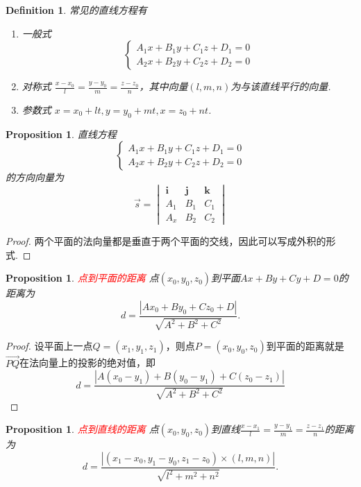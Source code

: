 \documentclass{article}
\newcommand{\mbf}[1]{\bm{#1}}
\newtheorem{proposition}[theorem]{Proposition}
\newtheorem{definition}[theorem]{Definition}
\newcommand{\redt}[1]{\textcolor{red}{#1}}
\begin{document}
\begin{definition}
\rm 常见的直线方程有
\begin{enumerate}
	\item 一般式
		$$
			\left\{
			\begin{array}{ll}
			A_1x+B_1y+C_1z+D_1 = 0 \\
			A_2x+B_2y+C_2z+D_2 = 0
			\end{array} \right.
		$$
	\item 对称式 $\frac{x-x_0}{l} = \frac{y-y_0}{m} = \frac{z-z_0}{n}$，其中向量$(l,m,n)$为与该直线平行的向量.
	\item 参数式 $x = x_0 + lt,y = y_0 + mt,x = z_0 + nt$. 	
\end{enumerate}
\end{definition}

\begin{proposition}
\rm 直线方程
$$
\left\{
			\begin{array}{ll}
			A_1x+B_1y+C_1z+D_1 = 0 \\
			A_2x+B_2y+C_2z+D_2 = 0
			\end{array} \right.
$$
的方向向量为
$$
\vec{s} = \begin{vmatrix}
\mbf{i} & \mbf{j} & \mbf{k} \\
A_1 & B_1 & C_1 \\
A_x & B_2 & C_2 
\end{vmatrix}
$$
\end{proposition}

\begin{proof}
两个平面的法向量都是垂直于两个平面的交线，因此可以写成外积的形式. 
\end{proof}

\begin{proposition}
\rm \redt{点到平面的距离} 点$(x_0,y_0,z_0)$到平面$Ax + By + Cy + D =0$的距离为
$$
d = \frac{|Ax_0 + By_0 + Cz_0 + D|}{\sqrt{A^2 + B^2 + C^2}}.
$$
\end{proposition}

\begin{proof}
设平面上一点$Q=(x_1,y_1,z_1)$，则点$P=(x_0,y_0,z_0)$到平面的距离就是$\vec{PQ}$在法向量上的投影的绝对值，即
$$
d = \frac{|A(x_0-y_1) + B(y_0-y_1) + C(z_0-z_1)|}{\sqrt{A^2 + B^2 + C^2}}
$$
\end{proof}

\begin{proposition}
\rm \redt{点到直线的距离} 点$(x_0,y_0,z_0)$到直线$\frac{x-x_1}{l} = \frac{y-y_1}{m} = \frac{z-z_1}{n}$的距离为
$$
d = \frac{|(x_1-x_0,y_1-y_0,z_1-z_0) \times (l,m,n)|}{\sqrt{l^2+m^2+n^2}}.
$$
\end{proposition}
\end{document}
